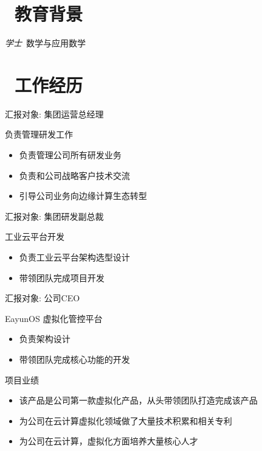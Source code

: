 \documentclass{resume}
\begin{document}


 
\section{\faGraduationCap\  教育背景}
\textit{学士}\ 数学与应用数学

\section{\faUsers\ 工作经历}

 {汇报对象: 集团运营总经理}

\begin{onehalfspacing}
负责管理研发工作
\begin{itemize}
  \item 负责管理公司所有研发业务
  \item 负责和公司战略客户技术交流
  \item 引导公司业务向边缘计算生态转型
\end{itemize}
\end{onehalfspacing}

 {汇报对象: 集团研发副总裁}

\begin{onehalfspacing}
工业云平台开发
\begin{itemize}
  \item 负责工业云平台架构选型设计
  \item 带领团队完成项目开发
\end{itemize}
\end{onehalfspacing}

 {汇报对象: 公司CEO}

\begin{onehalfspacing}
EayunOS 虚拟化管控平台
\begin{itemize}
  \item 负责架构设计
  \item 带领团队完成核心功能的开发
\end{itemize}

项目业绩
\begin{itemize}
  \item 该产品是公司第一款虚拟化产品，从头带领团队打造完成该产品
  \item 为公司在云计算虚拟化领域做了大量技术积累和相关专利
  \item 为公司在云计算，虚拟化方面培养大量核心人才
\end{itemize}
\end{onehalfspacing}
\end{document}
